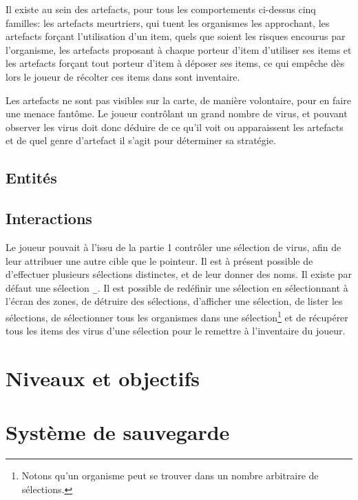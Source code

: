 \documentclass[a4paper,french]{article}
\begin{document}
Il existe au sein des artefacts, pour tous les comportements ci-dessus cinq
familles: les artefacts meurtriers, qui tuent les organismes les approchant,
les artefacts forçant l'utilisation d'un item, quels que soient les risques
encourus par l'organisme, les artefacts proposant à chaque porteur d'item
d'utiliser ses items et les artefacts forçant tout porteur d'item à déposer ses
items, ce qui empêche dès lors le joueur de récolter ces items dans sont
inventaire.
\medskip

Les artefacts ne sont pas visibles sur la carte, de manière volontaire, pour en
faire une menace fantôme. Le joueur contrôlant un grand nombre de virus, et
pouvant observer les virus doit donc déduire de ce qu'il voit ou apparaissent
les artefacts et de quel genre d'artefact il s'agit pour déterminer sa
stratégie.



\subsection{Entit\'es}

\subsection{Interactions}
Le joueur pouvait à l'issu de la partie 1 contrôler une sélection de virus, afin
de leur attribuer une autre cible que le pointeur. Il est à présent possible de
d'effectuer plusieurs sélections distinctes, et de leur donner des noms. Il
existe par défaut une sélection \texttt\_. Il est possible de redéfinir une
sélection en sélectionnant à l'écran des zones, de détruire des sélections,
d'afficher une sélection, de lister les sélections, de sélectionner tous les
organismes dans une sélection\footnote{Notons qu'un organisme peut se trouver
dans un nombre arbitraire de sélections.} et de récupérer tous les items des
virus d'une sélection pour le remettre à l'inventaire du joueur.

\section{Niveaux et objectifs}

\section{Syst\`eme de sauvegarde}
\end{document}
